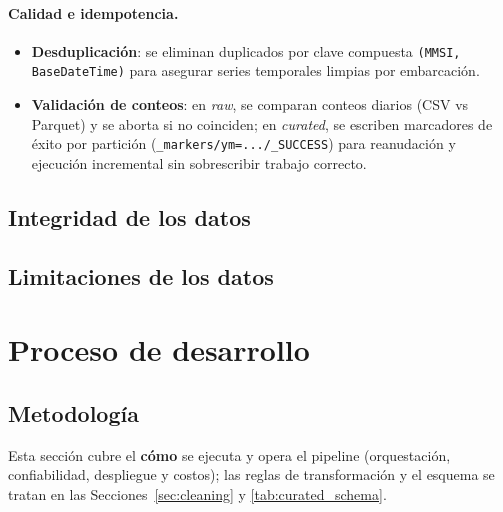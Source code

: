 \documentclass[10pt]{article}
\begin{document}
\paragraph{Calidad e idempotencia.}
\begin{itemize}
  \item \textbf{Desduplicación}: se eliminan duplicados por clave compuesta \texttt{(MMSI, BaseDateTime)} para asegurar series temporales limpias por embarcación.
  \item \textbf{Validación de conteos}: en \textit{raw}, se comparan conteos diarios (CSV vs Parquet) y se aborta si no coinciden; en \textit{curated}, se escriben marcadores de éxito por partición (\texttt{\_markers/ym=.../\_SUCCESS}) para reanudación y ejecución incremental sin sobrescribir trabajo correcto.
\end{itemize}
\subsection{Integridad de los datos} %
\subsection{Limitaciones de los datos} %
\section{Proceso de desarrollo}
\subsection{Metodología} %
\label{sec:metodologia}

Esta sección cubre el \textbf{cómo} se ejecuta y opera el pipeline (orquestación, confiabilidad, despliegue y costos); las reglas de transformación y el esquema se tratan en las Secciones~\ref{sec:cleaning} y \ref{tab:curated_schema}.
\end{document}
